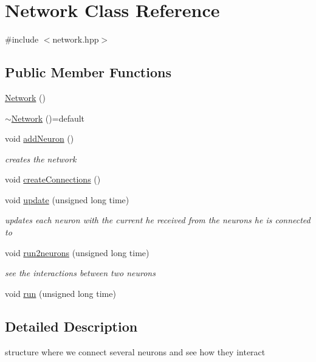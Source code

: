 \hypertarget{classNetwork}{\section{Network Class Reference}
\label{classNetwork}
}


{\ttfamily \#include $<$network.\-hpp$>$}

\subsection*{Public Member Functions}
\begin{DoxyCompactItemize}
\item 
\hyperlink{classNetwork_a3cc2fb4f8fa4d507077e8da85ce5a1c8}{Network} ()
\item 
\hyperlink{classNetwork_ac5138f30f4a492ea6967d18a3ebd1b0f}{$\sim$\-Network} ()=default
\item 
void \hyperlink{classNetwork_a5039a325d5be3df1030b324aef643cd9}{add\-Neuron} ()
\begin{DoxyCompactList}\small\item\em creates the network \end{DoxyCompactList}\item 
void \hyperlink{classNetwork_af6c535eb3684f7c7fe334e5b81200449}{create\-Connections} ()
\item 
void \hyperlink{classNetwork_a09909cad9fcf211d4e6f2013fdf476dc}{update} (unsigned long time)
\begin{DoxyCompactList}\small\item\em updates each neuron with the current he received from the neurons he is connected to \end{DoxyCompactList}\item 
void \hyperlink{classNetwork_aba0cd8b577bb7ed4a4a03c3b0fd2ac81}{run2neurons} (unsigned long time)
\begin{DoxyCompactList}\small\item\em see the interactions between two neurons \end{DoxyCompactList}\item 
void \hyperlink{classNetwork_ae83e7b65d599242de280d25e3c7ef3c2}{run} (unsigned long time)
\end{DoxyCompactItemize}


\subsection{Detailed Description}
structure where we connect several neurons and see how they interact 

